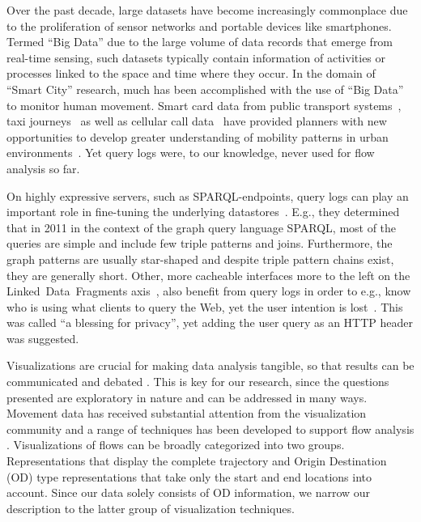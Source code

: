 \documentclass{sig-alternate}
\newcommand{\sparql}{{SPARQL}\xspace}
\begin{document}
Over the past decade, large datasets have become increasingly commonplace due to the proliferation of sensor networks and portable devices like smartphones.
Termed ``Big Data'' due to the large volume of data records that emerge from real-time sensing\cite{kitchin}, such datasets typically contain information of activities or processes linked to the space and time where they occur.
In the domain of ``Smart City'' research, much has been accomplished with the use of ``Big Data'' to monitor human movement.
Smart card data from public transport systems~\cite{roth,beecham}, taxi journeys~\cite{ferreira} as well as cellular call data~\cite{sevtsuk} have provided planners with new opportunities to develop greater understanding of mobility patterns in urban environments~\cite{batty}.
Yet query logs were, to our knowledge, never used for flow analysis so far.

On highly expressive servers, such as \sparql-endpoints, query logs can play an important role in fine-tuning the underlying datastores~\cite{arias2011empirical}.
E.g., they determined that in 2011 in the context of the graph query language \sparql, most of the queries are simple and include few triple patterns and joins.
Furthermore, the graph patterns are usually star-shaped and despite triple pattern chains exist, they are generally short.
Other, more cacheable interfaces more to the left on the Linked~Data~Fragments axis~\cite{ldf}, also benefit from query logs in order to e.g., know who is using what clients to query the Web, yet the user intention is lost~\cite{usewod2015}.
This was called ``a blessing for privacy'', yet adding the user query as an HTTP header was suggested.

Visualizations are crucial for making data analysis tangible, so that results can be communicated and debated \cite{robinson2008collaborative}. 
This is key for our research, since the questions presented are exploratory in nature \cite{kraak2008exploratory} and can be addressed in many ways. 
Movement data has received substantial attention from the visualization community and a range of techniques has been developed to support flow analysis \cite{andrienko2012visual}. 
Visualizations of flows can be broadly categorized into two groups. 
Representations that display the complete trajectory and Origin Destination (OD) type representations that take only the start and end locations into account.
Since our data solely consists of OD information, we narrow our description to the latter group of visualization techniques.
\end{document}
